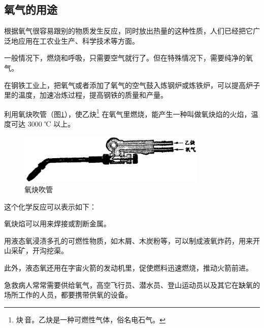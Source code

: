 \subsection{氧气的用途}

根据氧气很容易跟别的物质发生反应，同时放出热量的这种性质，人们已经把它广泛地应用在工农业生产、科学技术等方面。

一般情况下，燃烧和呼吸，只需要空气就行了。但在特殊情况下，需要纯净的氧气。

在钢铁工业上，把氧气或者添加了氧气的空气鼓入炼钢炉或炼铁炉，可以提高炉子里的温度，加速冶炼过程，提高钢铁的质量和产量。

利用氧炔吹管（图\ref{fig:1-8}），使乙炔\footnote{炔\,音。乙炔是一种可燃性气体，俗名电石气。}
在氧气里燃烧，能产生一种叫做氧炔焰的火焰，温度可达 $3000$ ℃ 以上。

\begin{figure}[htbp]
    \centering
    \includegraphics[width=9cm]{../pic/czhx1-ch1-8}
    \caption{氧炔吹管}\label{fig:1-8}
\end{figure}


这个化学反应可以表示如下：
\begin{fangchengshi}
\end{fangchengshi}

氧炔焰可以用来焊接或割断金属。

用液态氧浸渍多孔的可燃性物质，如木屑、木炭粉等，可以制成液氧炸药，用来开山采矿，开沟挖渠。

此外，液态氧还用在字宙火箭的发动机里，促使燃料迅速燃烧，推动火箭前进。

急救病人常常需要供给氧气，高空飞行员、潜水员、登山运动员以及其它在缺氧的场所工作的人员，都要携带供氧的设备。


